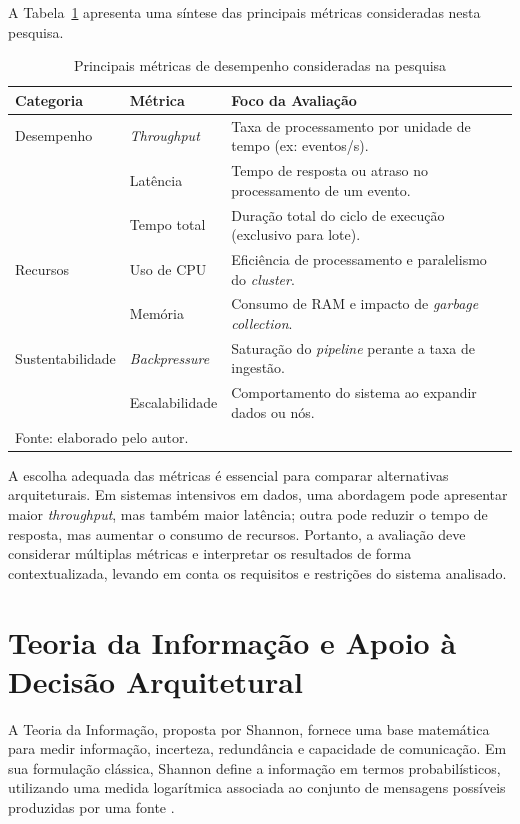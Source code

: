 A Tabela~\ref{tab:metricas-desempenho} apresenta uma síntese das principais métricas consideradas nesta pesquisa.


\begin{table}[htbp]
\centering
\caption{Principais métricas de desempenho consideradas na pesquisa}
\label{tab:metricas-desempenho}
\renewcommand{\arraystretch}{1.2} 
\begin{tabularx}{\textwidth}{l l X}
\toprule
\textbf{Categoria} & \textbf{Métrica} & \textbf{Foco da Avaliação} \\ 
\midrule
Desempenho & \textit{Throughput} & Taxa de processamento por unidade de tempo (ex: eventos/s). \\ 
           & Latência & Tempo de resposta ou atraso no processamento de um evento. \\ 
           & Tempo total & Duração total do ciclo de execução (exclusivo para lote). \\ 
\midrule
Recursos   & Uso de CPU & Eficiência de processamento e paralelismo do \textit{cluster}. \\ 
           & Memória & Consumo de RAM e impacto de \textit{garbage collection}. \\ 
\midrule
Sustentabilidade & \textit{Backpressure} & Saturação do \textit{pipeline} perante a taxa de ingestão. \\ 
                 & Escalabilidade & Comportamento do sistema ao expandir dados ou nós. \\ 
\bottomrule
\multicolumn{3}{l}{\footnotesize Fonte: elaborado pelo autor.} \\
\end{tabularx}
\end{table}

A escolha adequada das métricas é essencial para comparar alternativas arquiteturais. Em sistemas intensivos em dados, uma abordagem pode apresentar maior \textit{throughput}, mas também maior latência; outra pode reduzir o tempo de resposta, mas aumentar o consumo de recursos. Portanto, a avaliação deve considerar múltiplas métricas e interpretar os resultados de forma contextualizada, levando em conta os requisitos e restrições do sistema analisado.

\section{Teoria da Informação e Apoio à Decisão Arquitetural}
\label{sec:teoria-informacao}

A Teoria da Informação, proposta por Shannon, fornece uma base matemática para medir informação, incerteza, redundância e capacidade de comunicação. Em sua formulação clássica, Shannon define a informação em termos probabilísticos, utilizando uma medida logarítmica associada ao conjunto de mensagens possíveis produzidas por uma fonte \cite{shannon1948mathematical}.

